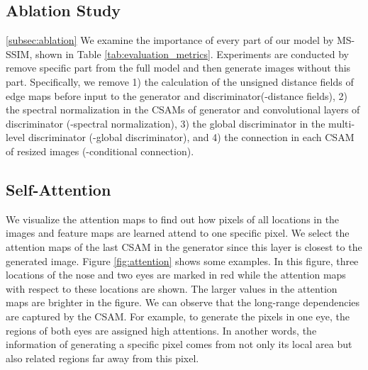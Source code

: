 \subsection{Ablation Study}
\ref{subsec:ablation}
We examine the importance of every part of our model by MS-SSIM, shown in Table \ref{tab:evaluation_metrics}. Experiments are conducted by remove specific part from the full model and then generate images without this part. Specifically, we remove 1) the calculation of the unsigned distance fields of edge maps before input to the generator and discriminator(-distance fields), 2) the spectral normalization in the CSAMs of generator and convolutional layers of discriminator (-spectral normalization), 3) the global discriminator in the multi-level discriminator (-global discriminator), and 4) the connection in each CSAM of resized images (-conditional connection). 
%
\subsection{Self-Attention}
We visualize the attention maps to find out how pixels of all locations in the images and feature maps are learned attend to one specific pixel. We select the attention maps of the last CSAM in the generator since this layer is closest to the generated image.  Figure \ref{fig:attention} shows some examples. In this figure, three locations of the nose and two eyes are marked in red while the attention maps with respect to these locations are shown. The larger values in the attention maps are brighter in the figure. We can observe that the long-range dependencies are captured by the CSAM. For example, to generate the pixels in one eye, the regions of both eyes are assigned high attentions. In another words, the information of generating a specific pixel comes from not only its local area but also related regions far away from this pixel. 
%

%